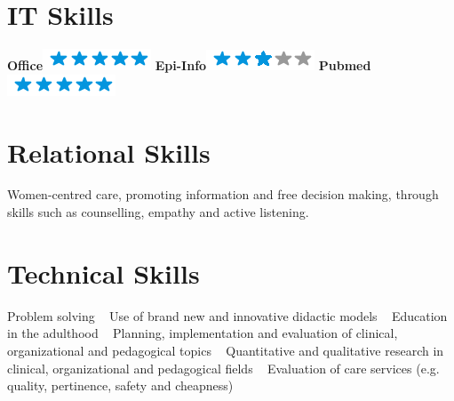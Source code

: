 \documentclass[11pt]{friggeri-cv}
\begin{document}
\begin{aside}
  \section{IT Skills}
  \textbf{Office}\includegraphics[scale=0.40]{img/5stars.png}
  \textbf{Epi-Info}\includegraphics[scale=0.40]{img/3stars.png}
  \textbf{Pubmed}\includegraphics[scale=0.40]{img/5stars.png}
  ~
  \section{Relational Skills}\footnotesize{
  Women-centred care, promoting information and free decision making, through 
  skills such as counselling, empathy and active listening}.
  ~
  \section{Technical Skills}\footnotesize{
  Problem solving
  ~
  Use of brand new and innovative didactic models
  ~
  Education in the adulthood
  ~
  Planning, implementation and evaluation of clinical, organizational and 
  pedagogical topics
  ~
  Quantitative and qualitative research in clinical, organizational and 
  pedagogical fields
  ~
  Evaluation of care services (e.g. quality, pertinence, safety and cheapness)}
\end{aside}

\vspace{-15pt}
\end{document}

